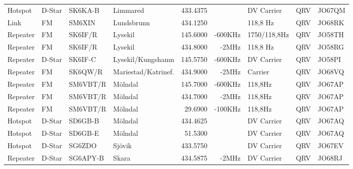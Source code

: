 \begin{landscape}
\begin{longtable}{llllrrlcl}
	Hotspot           & D-Star       & SK6KA-B       & Limmared            &          433.4375 &                & DV Carrier      &       QRV       & JO67QM           \\
	Link              & FM           & SM6XIN        & Lundsbrunn          &          434.1250 &                & 118,8 Hz        &       QRV       & JO68RK           \\
	Repeater          & FM           & SK6IF/R       & Lysekil             &          145.6000 &        -600KHz & 1750/118,8Hz    &       QRV       & JO58TH           \\
	Repeater          & FM           & SK6IF/R       & Lysekil             &          434.8000 &          -2MHz & 118,8 Hz        &       QRV       & JO58RG           \\
	Repeater          & D-Star       & SK6IF-C       & Lysekil/Kungshamn   &          145.5750 &        -600KHz & DV Carrier      &       QRV       & JO58PI           \\
	Repeater          & FM           & SK6QW/R       & Mariestad/Katrinef. &          434.9000 &          -2MHz & Carrier         &       QRV       & JO68VQ           \\
	Repeater          & FM           & SM6VBT/R      & Mölndal             &          145.7000 &        -600KHz & 118,8Hz         &       QRV       & JO67AP           \\
	Repeater          & FM           & SM6VBT/R      & Mölndal             &          434.7000 &          -2MHz & 118,8Hz         &       QRV       & JO67AP           \\
	Repeater          & FM           & SM6VBT/R      & Mölndal             &           29.6900 &        -100KHz & 118,8Hz         &       QRV       & JO67AP           \\
	Hotspot           & D-Star       & SD6GB-B       & Mölndal             &          434.4625 &                & DV Carrier      &       QRV       & JO67AQ           \\
	Hotspot           & D-Star       & SD6GB-E       & Mölndal             &           51.5300 &                & DV Carrier      &       QRV       & JO67AQ           \\
	Hotspot           & D-Star       & SG6ZDO        & Sjövik              &          433.5750 &                & DV Carrier      &       QRV       & JO67EV           \\
	Repeater          & D-Star       & SG6APY-B      & Skara               &          434.5875 &          -2MHz & DV Carrier      &       QRV       & JO68RJ           \\

\end{longtable}
\end{landscape}
